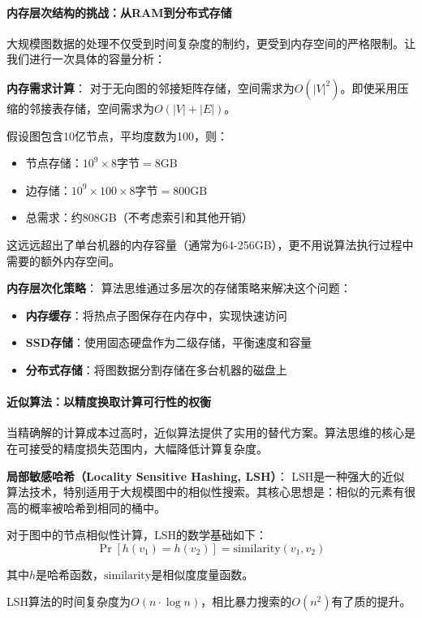 \paragraph{内存层次结构的挑战：从RAM到分布式存储}
大规模图数据的处理不仅受到时间复杂度的制约，更受到内存空间的严格限制。让我们进行一次具体的容量分析：

\textbf{内存需求计算}：
对于无向图的邻接矩阵存储，空间需求为$O(|V|^2)$。即使采用压缩的邻接表存储，空间需求为$O(|V|+|E|)$。

假设图包含10亿节点，平均度数为100，则：
\begin{itemize}
\item 节点存储：$10^9 \times 8\text{字节} = 8\text{GB}$
\item 边存储：$10^9 \times 100 \times 8\text{字节} = 800\text{GB}$
\item 总需求：约808GB（不考虑索引和其他开销）
\end{itemize}

这远远超出了单台机器的内存容量（通常为64-256GB），更不用说算法执行过程中需要的额外内存空间。

\textbf{内存层次化策略}：
算法思维通过多层次的存储策略来解决这个问题：
\begin{itemize}
\item \textbf{内存缓存}：将热点子图保存在内存中，实现快速访问
\item \textbf{SSD存储}：使用固态硬盘作为二级存储，平衡速度和容量
\item \textbf{分布式存储}：将图数据分割存储在多台机器的磁盘上
\end{itemize}

\paragraph{近似算法：以精度换取计算可行性的权衡}
当精确解的计算成本过高时，近似算法提供了实用的替代方案。算法思维的核心是在可接受的精度损失范围内，大幅降低计算复杂度。

\textbf{局部敏感哈希（Locality Sensitive Hashing, LSH）}：
LSH是一种强大的近似算法技术，特别适用于大规模图中的相似性搜索。其核心思想是：相似的元素有很高的概率被哈希到相同的桶中。

对于图中的节点相似性计算，LSH的数学基础如下：
$$\Pr[h(v_1) = h(v_2)] = \text{similarity}(v_1, v_2)$$

其中$h$是哈希函数，$\text{similarity}$是相似度度量函数。

LSH算法的时间复杂度为$O(n \cdot \log n)$，相比暴力搜索的$O(n^2)$有了质的提升。

